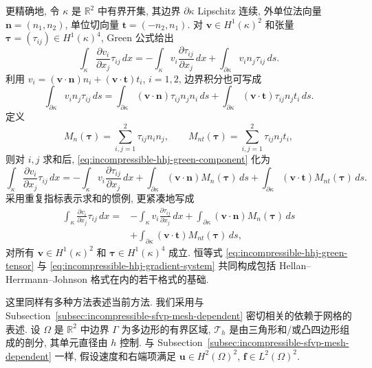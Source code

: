 更精确地, 令 $\kappa$ 是 $\mathbb R^2$ 中有界开集,
其边界 $\partial\kappa$ Lipschitz 连续,
外单位法向量 $\mathbf n=(n_1,n_2)$,
单位切向量 $\mathbf t=(-n_2,n_1)$.
对 $\mathbf v\in H^1(\kappa)^2$
和张量 $\boldsymbol\tau=(\tau_{ij})\in H^1(\kappa)^4$,
Green 公式给出
\begin{equation}\label{eq:incompressible-hhj-green-component}
\int_\kappa\frac{\partial v_i}{\partial x_j}\tau_{ij}\,dx
=-\int_\kappa v_i\frac{\partial\tau_{ij}}{\partial x_j}\,dx
+\int_{\partial\kappa}v_i n_j\tau_{ij}\,ds.
\end{equation}
利用 $v_i=(\mathbf v\cdot\mathbf n)n_i
+(\mathbf v\cdot\mathbf t)t_i$, $i=1,2$,
边界积分也可写成
\[
\int_{\partial\kappa}v_i n_j\tau_{ij}\,ds
=\int_{\partial\kappa}(\mathbf v\cdot\mathbf n)
\tau_{ij}n_jn_i\,ds
+\int_{\partial\kappa}(\mathbf v\cdot\mathbf t)
\tau_{ij}n_jt_i\,ds.
\]
定义
\begin{equation}\label{eq:incompressible-hhj-normal-moments}
M_n(\boldsymbol\tau)
=\sum_{i,j=1}^2\tau_{ij}n_in_j,
\qquad
M_{nt}(\boldsymbol\tau)
=\sum_{i,j=1}^2\tau_{ij}n_jt_i,
\end{equation}
则对 $i,j$ 求和后,
\eqref{eq:incompressible-hhj-green-component} 化为
\[
\int_\kappa\frac{\partial v_i}{\partial x_j}\tau_{ij}\,dx
=-\int_\kappa v_i\frac{\partial\tau_{ij}}{\partial x_j}\,dx
+\int_{\partial\kappa}(\mathbf v\cdot\mathbf n)
M_n(\boldsymbol\tau)\,ds
+\int_{\partial\kappa}(\mathbf v\cdot\mathbf t)
M_{nt}(\boldsymbol\tau)\,ds.
\]
采用重复指标表示求和的惯例, 更紧凑地写成
\begin{equation}\label{eq:incompressible-hhj-green-tensor}
\begin{split}
\int_\kappa\frac{\partial v_i}{\partial x_j}\tau_{ij}\,dx
={}&-\int_\kappa v_i\frac{\partial\tau_{ij}}{\partial x_j}\,dx
+\int_{\partial\kappa}(\mathbf v\cdot\mathbf n)
M_n(\boldsymbol\tau)\,ds\\
&+\int_{\partial\kappa}(\mathbf v\cdot\mathbf t)
M_{nt}(\boldsymbol\tau)\,ds,
\end{split}
\end{equation}
对所有 $\mathbf v\in H^1(\kappa)^2$
和 $\boldsymbol\tau\in H^1(\kappa)^4$ 成立.
恒等式 \eqref{eq:incompressible-hhj-green-tensor}
与 \eqref{eq:incompressible-hhj-gradient-system}
共同构成包括 Hellan--Herrmann--Johnson 格式在内的若干格式的基础.

这里同样有多种方法表述当前方法.
我们采用与 Subsection~\ref{subsec:incompressible-sfvp-mesh-dependent}
密切相关的依赖于网格的表述.
设 $\Omega$ 是 $\mathbb R^2$ 中边界 $\Gamma$ 为多边形的有界区域,
$\mathcal T_h$ 是由三角形和/或凸四边形组成的剖分,
其单元直径由 $h$ 控制.
与 Subsection~\ref{subsec:incompressible-sfvp-mesh-dependent} 一样,
假设速度和右端项满足
$\mathbf u\in H^2(\Omega)^2$, $\mathbf f\in L^2(\Omega)^2$.

